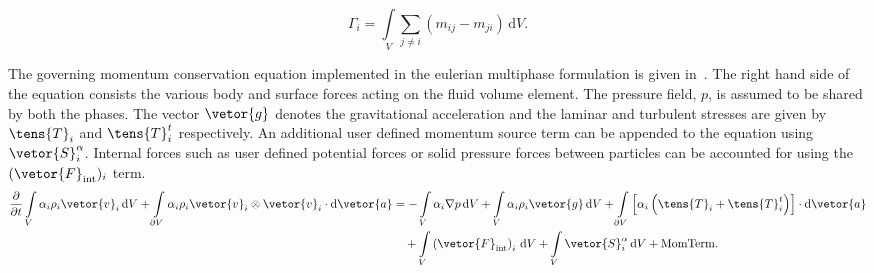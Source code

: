 \begin{equation}
    \Gamma_{i} = \int\limits_{V} \sum_{j \neq i} (m_{ij} - m_{ji})\,\mathrm{d}V .
\end{equation}
 


The governing momentum conservation equation implemented in the eulerian 
 multiphase formulation is given in~. 
 The right hand side of the equation consists the various body and surface forces acting on the 
 fluid volume element. The pressure field, $p$, is assumed to be
 shared by both the phases. The vector $\vetor{g}$ denotes the gravitational acceleration and
 the laminar and turbulent stresses are given by $\tens{T}_{i}$ and $\tens{T}^{t}_{i}$ respectively.
 An additional user defined momentum source term can be appended to the equation using
 $\vetor{S}^{\alpha}_{i}$. Internal forces such as user defined potential forces or 
 solid pressure forces between particles can be accounted for using the $(\vetor{F}_{\text{int}})_{i}$ term.
\begin{equation}\label{eq:emp-mom-conserv}
\begin{split}
\frac{\partial}{\partial t}
\int\limits_{V} \alpha_{i} \rho_{i} \vetor{v}_{i} \,\mathrm{d}V
+ \int\limits_{\partial V} \alpha_{i} \rho_{i} \vetor{v}_{i} \otimes \vetor{v}_{i} \cdot \mathrm{d}\vetor{a}
&= -\int\limits_{V} \alpha_{i} \nabla p \,\mathrm{d}V
+ \int\limits_{V} \alpha_{i} \rho_{i} \vetor{g} \,\mathrm{d}V 
+ \int\limits_{\partial V} \left[ \alpha_{i} \left( \tens{T}_{i} + \tens{T}^{t}_{i} \right) \right] \cdot \mathrm{d}\vetor{a} \\
&\quad {} + \int\limits_{V} \left( \vetor{F}_{\text{int}} \right)_{i} \,\mathrm{d}V
+ \int\limits_{V} \vetor{S}^{\alpha}_{i} \,\mathrm{d}V
+ \mathrm{MomTerm}.
\end{split}
\end{equation}

